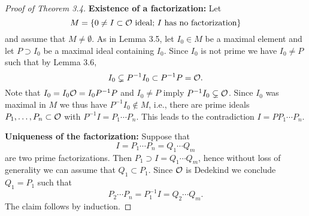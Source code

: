 \begin{proof}[Proof of Theorem 3.4]
	\textbf{Existence of a factorization:} Let
	\[ M = \left\{  0 \neq I \subset \mathcal{O} \text{ ideal; $I$ has no factorization} \right\}
	\]
	and assume that $M\neq \emptyset$. As in Lemma 3.5, let $I_0 \in M$ be a maximal element and let $P \supset I_0$ be a maximal ideal containing $I_0$.
	Since $I_0$ is not prime we have $I_0 \neq P$ such that by Lemma 3.6,
	\[ I_0 \subsetneq P^{-1} I_0 \subset P^{-1} P = \mathcal{O}.
	\]
	Note that $I_0 = I_0 \mathcal{O} = I_0 P^{-1} P$ and $I_0 \neq P$ imply $P^{-1}I_0 \subsetneq \mathcal{O}$.
	Since $I_0$ was maximal in $M$ we thus have $P^{-1}I_0 \not \in M$, i.e., there are prime ideals $P_1, \dots, P_n \subset \mathcal{O}$ with $P^{-1} I = P_1 \cdots P_n$.
	This leads to the contradiction $I=PP_1 \cdots P_n$.
	
	\bigskip \textbf{Uniqueness of the factorization:} Suppose that
	\[ I=P_1 \cdots P_n =Q_1 \cdots Q_m
	\]
	are two prime factorizations. Then $P_1 \supset I =Q_1 \cdots Q_m$, hence without loss of generality we can assume that $Q_1 \subset P_1$. Since $\mathcal{O}$ is Dedekind we conclude $Q_1 = P_1$ such that 
	\[ P_2 \cdots P_n = P_1^{-1} I = Q_2 \cdots Q_m.
	\]
	The claim follows by induction.
\end{proof}


































